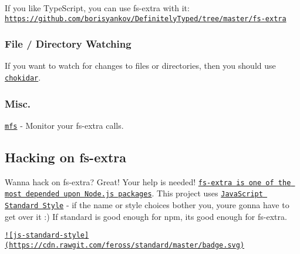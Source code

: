 If you like Type\+Script, you can use {\ttfamily fs-\/extra} with it\+: \href{https://github.com/borisyankov/DefinitelyTyped/tree/master/fs-extra}{\tt https\+://github.\+com/borisyankov/\+Definitely\+Typed/tree/master/fs-\/extra}

\subsubsection*{File / Directory Watching}

If you want to watch for changes to files or directories, then you should use \href{https://github.com/paulmillr/chokidar}{\tt chokidar}.

\subsubsection*{Misc.}


\begin{DoxyItemize}
\item \href{https://github.com/cadorn/mfs}{\tt mfs} -\/ Monitor your fs-\/extra calls.
\end{DoxyItemize}

\subsection*{Hacking on fs-\/extra }

Wanna hack on {\ttfamily fs-\/extra}? Great! Your help is needed! \href{http://nodei.co/npm/fs-extra.png?downloads=true&downloadRank=true&stars=true}{\tt fs-\/extra is one of the most depended upon Node.\+js packages}. This project uses \href{https://github.com/feross/standard}{\tt Java\+Script Standard Style} -\/ if the name or style choices bother you, you\textquotesingle{}re gonna have to get over it \+:) If {\ttfamily standard} is good enough for {\ttfamily npm}, it\textquotesingle{}s good enough for {\ttfamily fs-\/extra}.

\href{https://github.com/feross/standard}{\tt !\mbox{[}js-\/standard-\/style\mbox{]}(https\+://cdn.\+rawgit.\+com/feross/standard/master/badge.\+svg)}

